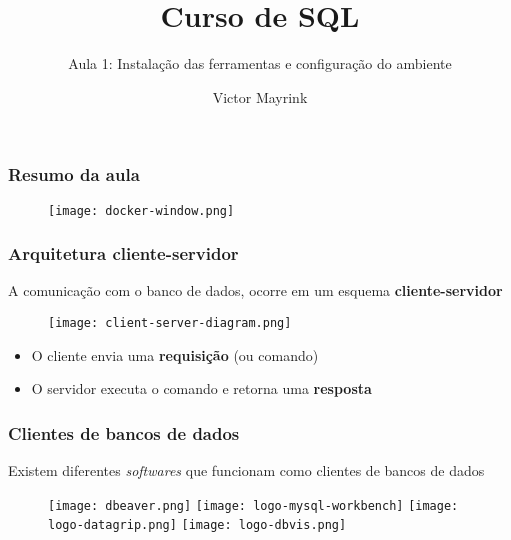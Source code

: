 \documentclass[t, 10pt, aspectratio=169, table, x11names]{beamer}
\begin{document}
	\author{Victor Mayrink}
	\title{Curso de SQL}
	\subtitle{Aula 1: Instalação das ferramentas e configuração do ambiente}

	\begin{frame}[plain]
		\maketitle
	\end{frame}
	
	\begin{frame}
		\frametitle{Resumo da aula}
		\vspace{0.5cm}
		\begin{figure}[h]
			\texttt{[image: docker-window.png]}
		\end{figure}
	\end{frame}

	\begin{frame}
		\frametitle{Arquitetura cliente-servidor}
		A comunicação com o banco de dados, ocorre em um esquema \textbf{cliente-servidor}
		\vspace{3mm}
		\begin{figure}[h]
			\texttt{[image: client-server-diagram.png]}
		\end{figure}
		\begin{itemize}
			\item O cliente envia uma \textbf{requisição} (ou comando)
			\item O servidor executa o comando e retorna uma \textbf{resposta}
		\end{itemize}
	\end{frame}
	
	\begin{frame}
		\frametitle{Clientes de bancos de dados}
		Existem diferentes \textit{softwares} que funcionam como clientes de bancos de dados
		\begin{figure}
			\vspace{2mm}
			\centering
			\texttt{[image: dbeaver.png]}
			\hspace{5mm}
			\texttt{[image: logo-mysql-workbench]}
			\hspace{5mm}
			\texttt{[image: logo-datagrip.png]}
			\hspace{5mm}
			\texttt{[image: logo-dbvis.png]}
		\end{figure}
	\end{frame}
\end{document}
